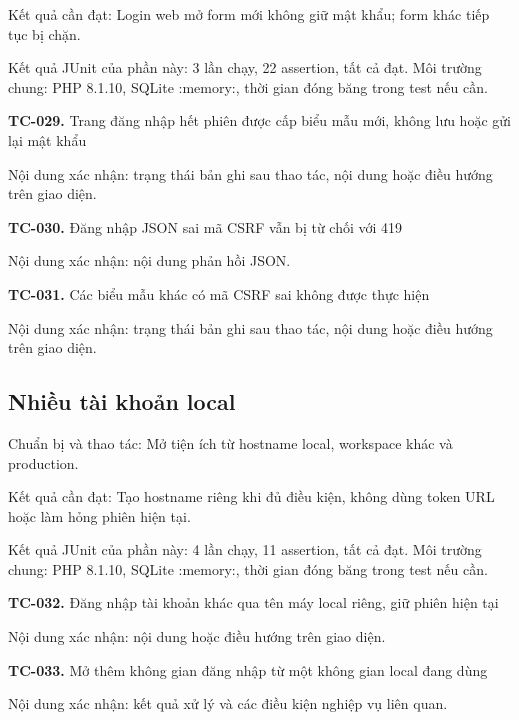 Kết quả cần đạt:\allowbreak{} Login web mở form mới không giữ mật khẩu; form khác tiếp tục bị chặn.\allowbreak{}

Kết quả JUnit của phần này:\allowbreak{} 3 lần chạy, 22 assertion, tất cả đạt.\allowbreak{} Môi trường chung:\allowbreak{} PHP 8.\allowbreak{}1.\allowbreak{}10, SQLite :\allowbreak{}memory:\allowbreak{}, thời gian đóng băng trong test nếu cần.\allowbreak{}

\noindent\textbf{TC-029.} Trang đăng nhập hết phiên được cấp biểu mẫu mới, không lưu hoặc gửi lại mật khẩu\par
Nội dung xác nhận:\allowbreak{} trạng thái bản ghi sau thao tác, nội dung hoặc điều hướng trên giao diện.\allowbreak{}

\noindent\textbf{TC-030.} Đăng nhập JSON sai mã CSRF vẫn bị từ chối với 419\par
Nội dung xác nhận:\allowbreak{} nội dung phản hồi JSON.\allowbreak{}

\noindent\textbf{TC-031.} Các biểu mẫu khác có mã CSRF sai không được thực hiện\par
Nội dung xác nhận:\allowbreak{} trạng thái bản ghi sau thao tác, nội dung hoặc điều hướng trên giao diện.\allowbreak{}


\par\vspace{8pt}

\subsection{Nhiều tài khoản local}
Chuẩn bị và thao tác:\allowbreak{} Mở tiện ích từ hostname local, workspace khác và production.\allowbreak{}

Kết quả cần đạt:\allowbreak{} Tạo hostname riêng khi đủ điều kiện, không dùng token URL hoặc làm hỏng phiên hiện tại.\allowbreak{}

Kết quả JUnit của phần này:\allowbreak{} 4 lần chạy, 11 assertion, tất cả đạt.\allowbreak{} Môi trường chung:\allowbreak{} PHP 8.\allowbreak{}1.\allowbreak{}10, SQLite :\allowbreak{}memory:\allowbreak{}, thời gian đóng băng trong test nếu cần.\allowbreak{}

\noindent\textbf{TC-032.} Đăng nhập tài khoản khác qua tên máy local riêng, giữ phiên hiện tại\par
Nội dung xác nhận:\allowbreak{} nội dung hoặc điều hướng trên giao diện.\allowbreak{}

\noindent\textbf{TC-033.} Mở thêm không gian đăng nhập từ một không gian local đang dùng\par
Nội dung xác nhận:\allowbreak{} kết quả xử lý và các điều kiện nghiệp vụ liên quan.\allowbreak{}

